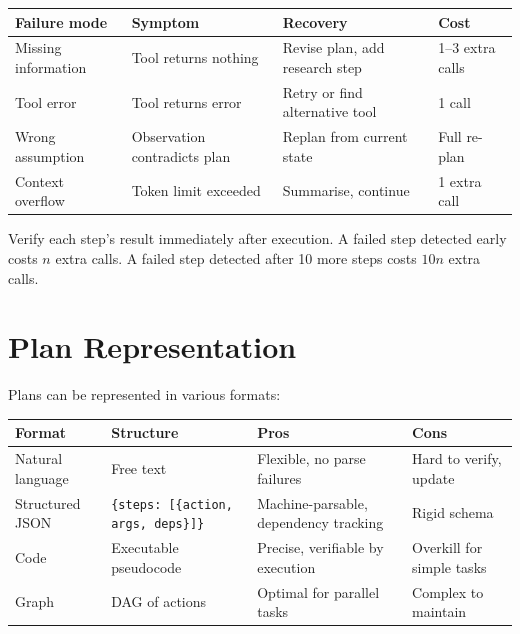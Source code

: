 \begin{longtable}{p{3.5cm}p{4cm}p{4cm}p{3cm}}
	\toprule
	\textbf{Failure mode} & \textbf{Symptom}             & \textbf{Recovery}              & \textbf{Cost}    \\
	\midrule
	Missing information   & Tool returns nothing         & Revise plan, add research step & 1--3 extra calls \\
	Tool error            & Tool returns error           & Retry or find alternative tool & 1 call           \\
	Wrong assumption      & Observation contradicts plan & Replan from current state      & Full re-plan     \\
	Context overflow      & Token limit exceeded         & Summarise, continue            & 1 extra call     \\
	\bottomrule
\end{longtable}

\begin{principle}
	Verify each step's result immediately after execution. A failed step detected early costs $n$ extra calls. A failed step detected after 10 more steps costs $10n$ extra calls.
\end{principle}

\section{Plan Representation}

Plans can be represented in various formats:

\begin{longtable}{p{3cm}p{4cm}p{4cm}p{3.5cm}}
	\toprule
	\textbf{Format}  & \textbf{Structure}                           & \textbf{Pros}                         & \textbf{Cons}             \\
	\midrule
	Natural language & Free text                                    & Flexible, no parse failures           & Hard to verify, update    \\
	Structured JSON  & \texttt{\{steps: [\{action, args, deps\}]\}} & Machine-parsable, dependency tracking & Rigid schema              \\
	Code             & Executable pseudocode                        & Precise, verifiable by execution      & Overkill for simple tasks \\
	Graph            & DAG of actions                               & Optimal for parallel tasks            & Complex to maintain       \\
	\bottomrule
\end{longtable}

